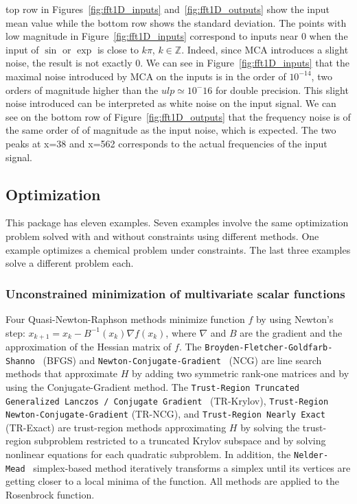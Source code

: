  top row in Figures~\ref{fig:fft1D_inputs} and~\ref{fig:fft1D_outputs} show the
input mean value while the bottom row shows the standard deviation. The points
with low magnitude in Figure~\ref{fig:fft1D_inputs} correspond to inputs near 0
when the input of $\sin$ or $\exp$ is close to $k\pi$, $k \in \mathbb{Z}$.
Indeed, since MCA introduces a slight noise, the result is not exactly 0. We can
see in Figure~\ref{fig:fft1D_inputs} that the maximal noise introduced by MCA on
the inputs is in the order of $10^{-14}$, two orders of magnitude higher than
the $ulp \simeq 10^-16$ for double precision. This slight noise introduced can
be interpreted as white noise on the input signal. We can see on the bottom row
of Figure~\ref{fig:fft1D_outputs} that the frequency noise is of the same order
of of magnitude as the input noise, which is expected. The two peaks at x=38 and
x=562 corresponds to the actual frequencies of the input signal.

\subsection{Optimization}

This package has eleven examples. Seven examples involve the same optimization
problem solved with and without constraints using different methods. One example
optimizes a chemical problem under constraints. The last three examples solve a
different problem each.

\subsubsection{Unconstrained minimization of multivariate scalar functions}
Four Quasi-Newton-Raphson methods minimize function $f$ by using Newton's step:
$x_{k+1} = x_{k} - B^{-1}(x_k)\nabla f(x_k)$, where $\nabla$ and $B$ are the
gradient and the approximation of the Hessian matrix of $f$. The
\texttt{Broyden-Fletcher-Goldfarb-Shanno}~\cite{BFGS} (BFGS) and
\texttt{Newton-Conjugate-Gradient}~\cite{nocedal2006numerical} (NCG) are line
search methods that approximate $H$ by adding two symmetric rank-one matrices
and by using the Conjugate-Gradient method. The \texttt{Trust-Region Truncated
    Generalized Lanczos / Conjugate Gradient}~\cite{gould1999solving} (TR-Krylov),
\texttt{Trust-Region Newton-Conjugate-Gradient} (TR-NCG), and
\texttt{Trust-Region Nearly Exact}~\cite{nocedal2006numerical} (TR-Exact) are
trust-region methods approximating $H$ by solving the trust-region subproblem
restricted to a truncated Krylov subspace and by solving nonlinear equations for
each quadratic subproblem. In addition, the
\texttt{Nelder-Mead}~\cite{singer2009nelder} simplex-based method iteratively
transforms a simplex until its vertices are getting closer to a local minima of
the function. All methods are applied to the Rosenbrock function.

